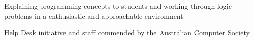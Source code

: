 {{            \item Explaining programming concepts to students and working through logic problems in a enthusiastic and approachable environment
            \item Help Desk initiative and staff commended by the Australian Computer Society
        }
}
